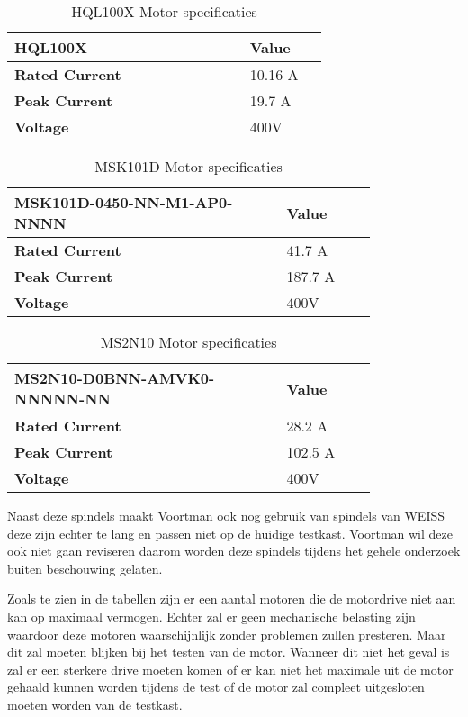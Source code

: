 \begin{table}[H]
	\caption{HQL100X Motor specificaties}
	\label{tab:HQL100X}
	\centering
	\begin{tabular}{|p{0.6\linewidth}|p{0.2\linewidth}|}
		\hline
		\textbf{HQL100X} & \textbf{Value} \\
		\hline
		\textbf{Rated Current} & 10.16 \gls{A} \\
		\textbf{Peak Current} & 19.7 \gls{A} \\
		\textbf{Voltage} & 400\gls{V} \\
		\hline
	\end{tabular}
\end{table}

\begin{table}[H]
	\caption{MSK101D Motor specificaties}
	\label{tab:HQL100X}
	\centering
	\begin{tabular}{|p{0.6\linewidth}|p{0.2\linewidth}|}
		\hline
		\textbf{MSK101D-0450-NN-M1-AP0-NNNN} & \textbf{Value} \\
		\hline
		\textbf{Rated Current} & 41.7 \gls{A} \\
		\textbf{Peak Current} & 187.7 \gls{A} \\
		\textbf{Voltage} & 400\gls{V} \\
		\hline
	\end{tabular}
\end{table}

\begin{table}[H]
	\caption{MS2N10 Motor specificaties}
	\label{tab:HQL100X}
	\centering
	\begin{tabular}{|p{0.6\linewidth}|p{0.2\linewidth}|}
		\hline
		\textbf{MS2N10-D0BNN-AMVK0-NNNNN-NN} & \textbf{Value} \\
		\hline
		\textbf{Rated Current} & 28.2 \gls{A} \\
		\textbf{Peak Current} & 102.5 \gls{A} \\
		\textbf{Voltage} & 400\gls{V} \\
		\hline
	\end{tabular}
\end{table}


Naast deze spindels maakt Voortman ook nog gebruik van spindels van WEISS deze zijn echter te lang en passen niet op de huidige testkast. Voortman wil deze ook niet gaan reviseren daarom worden deze spindels tijdens het gehele onderzoek buiten beschouwing gelaten.

\vspace{0.5cm}

Zoals te zien in de tabellen zijn er een aantal motoren die de motordrive niet aan kan op maximaal vermogen. Echter zal er geen mechanische belasting zijn waardoor deze motoren waarschijnlijk zonder problemen zullen presteren. Maar dit zal moeten blijken bij het testen van de motor. Wanneer dit niet het geval is zal er een sterkere drive moeten komen of er kan niet het maximale uit de motor gehaald kunnen worden tijdens de test of de motor zal compleet uitgesloten moeten worden van de testkast.

